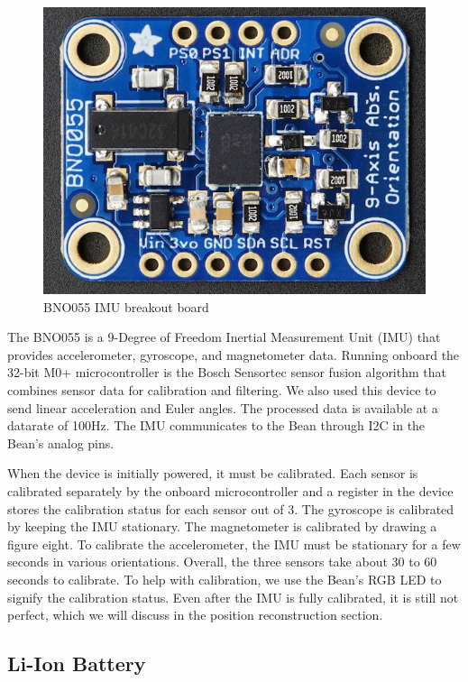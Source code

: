 \documentclass[10pt,journal]{IEEEtran}
\begin{document}
\begin{figure}[H]
    \includegraphics[width=0.6\linewidth]{figures/imu}
  \caption{BNO055 IMU breakout board}
  \label{fig:imu}
\end{figure}
  The BNO055 is a 9-Degree of Freedom Inertial Measurement Unit (IMU) that provides accelerometer, gyroscope, and magnetometer data. Running onboard the 32-bit M0+ microcontroller is the Bosch Sensortec sensor fusion algorithm that combines sensor data for calibration and filtering. We also used this device to send linear acceleration and Euler angles. The processed data is available at a datarate of 100Hz. The IMU communicates to the Bean through I2C in the Bean’s analog pins.
\par When the device is initially powered, it must be calibrated. Each sensor is calibrated separately by the onboard microcontroller and a register in the device stores the calibration status for each sensor out of 3. The gyroscope is calibrated by keeping the IMU stationary. The magnetometer is calibrated by drawing a figure eight. To calibrate the accelerometer, the IMU must be stationary for a few seconds in various orientations. Overall, the three sensors take about 30 to 60 seconds to calibrate. To help with calibration, we use the Bean’s RGB LED to signify the calibration status. Even after the IMU is fully calibrated, it is still not perfect, which we will discuss in the position reconstruction section.
\subsection{Li-Ion Battery}
\end{document}
